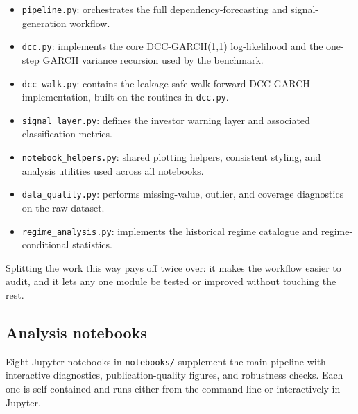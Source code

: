 \begin{itemize}
    \item \texttt{pipeline.py}: orchestrates the full dependency-forecasting and signal-generation workflow.
    \item \texttt{dcc.py}: implements the core DCC-GARCH(1,1) log-likelihood and the one-step GARCH variance recursion used by the benchmark.
    \item \texttt{dcc\_walk.py}: contains the leakage-safe walk-forward DCC-GARCH implementation, built on the routines in \texttt{dcc.py}.
    \item \texttt{signal\_layer.py}: defines the investor warning layer and associated classification metrics.
    \item \texttt{notebook\_helpers.py}: shared plotting helpers, consistent styling, and analysis utilities used across all notebooks.
    \item \texttt{data\_quality.py}: performs missing-value, outlier, and coverage diagnostics on the raw dataset.
    \item \texttt{regime\_analysis.py}: implements the historical regime catalogue and regime-conditional statistics.
\end{itemize}

Splitting the work this way pays off twice over: it makes the workflow easier to audit, and it lets any one module be tested or improved without touching the rest.

\subsection{Analysis notebooks}

Eight Jupyter notebooks in \texttt{notebooks/} supplement the main pipeline with interactive diagnostics, publication-quality figures, and robustness checks. Each one is self-contained and runs either from the command line or interactively in Jupyter.

